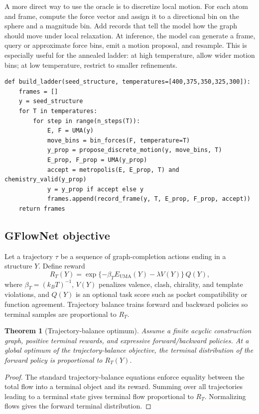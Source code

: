 \documentclass[11pt]{article}
\newtheorem{theorem}[definition]{Theorem}
\newcommand{\1}{\mathbf{1}}
\begin{document}
A more direct way to use the oracle is to discretize local motion. For each atom and frame, compute the force vector and assign it to a directional bin on the sphere and a magnitude bin. Add records that tell the model how the graph should move under local relaxation. At inference, the model can generate a frame, query or approximate force bins, emit a motion proposal, and resample. This is especially useful for the annealed ladder: at high temperature, allow wider motion bins; at low temperature, restrict to smaller refinements.

\begin{lstlisting}[caption={Constructing a UMA-labeled annealed ladder.}]
def build_ladder(seed_structure, temperatures=[400,375,350,325,300]):
    frames = []
    y = seed_structure
    for T in temperatures:
        for step in range(n_steps(T)):
            E, F = UMA(y)
            move_bins = bin_forces(F, temperature=T)
            y_prop = propose_discrete_motion(y, move_bins, T)
            E_prop, F_prop = UMA(y_prop)
            accept = metropolis(E, E_prop, T) and chemistry_valid(y_prop)
            y = y_prop if accept else y
            frames.append(record_frame(y, T, E_prop, F_prop, accept))
    return frames
\end{lstlisting}

\subsection{GFlowNet objective}

Let a trajectory $\tau$ be a sequence of graph-completion actions ending in a structure $Y$. Define reward
\[
R_T(Y)=\exp\{-\beta_T E_{\mathrm{UMA}}(Y)-\lambda V(Y)\}\,Q(Y),
\]
where $\beta_T=(k_BT)^{-1}$, $V(Y)$ penalizes valence, clash, chirality, and template violations, and $Q(Y)$ is an optional task score such as pocket compatibility or function agreement. Trajectory balance trains forward and backward policies so terminal samples are proportional to $R_T$.

\begin{theorem}[Trajectory-balance optimum]
Assume a finite acyclic construction graph, positive terminal rewards, and expressive forward/backward policies. At a global optimum of the trajectory-balance objective, the terminal distribution of the forward policy is proportional to $R_T(Y)$.
\end{theorem}
\begin{proof}
The standard trajectory-balance equations enforce equality between the total flow into a terminal object and its reward. Summing over all trajectories leading to a terminal state gives terminal flow proportional to $R_T$. Normalizing flows gives the forward terminal distribution.\end{proof}
\end{document}
